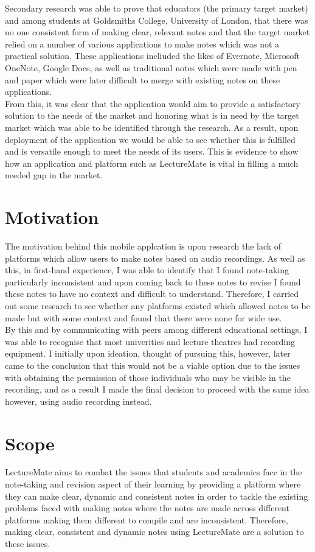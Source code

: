 \documentclass{report}
\begin{document}
Secondary research was able to prove that educators (the primary target market) and among students at Goldsmiths College, University of London, that there was no one consistent form of making clear, relevant notes and that the target market relied on a number of various applications to make notes which was not a practical solution. These applications incliuded the likes of Evernote, Microsoft OneNote, Google Docs, as well as traditional notes which were made with pen and paper which were later difficult to merge with existing notes on these applications.\\

From this, it was clear that the application would aim to provide a satisfactory solution to the needs of the market and honoring what is in need by the target market which was able to be identified through the research. As a result, upon deployment of the application we would be able to see whether this is fulfilled and is versatile enough to meet the needs of its users. This is evidence to show how an application and platform such as LectureMate is vital in filling a much needed gap in the market.

	\section{Motivation}
The motivation behind this mobile applcation is upon research the lack of platforms which allow users to make notes based on audio recordings. As well as this, in first-hand experience, I was able to identify that I found note-taking particularly inconsistent and upon coming back to these notes to revise I found these notes to have no context and difficult to understand. Therefore, I carried out some research to see whether any platforms existed which allowed notes to be made but with some context and found that there were none for wide use.\\

By this and by communicating with peers among different educational settings, I was able to recognise that most univerities and lecture theatres had recording equipment. I initially upon ideation, thought of pursuing this, however, later came to the conclusion that this would not be a viable option due to the issues with obtaining the permission of those individuals who may be visible in the recording, and as a result I made the final decision to proceed with the same idea however, using audio recording instead.

	\section{Scope}
LectureMate aims to combat the issues that students and academics face in the note-taking and revision aspect of their learning by providing a platform where they can make clear, dynamic and consistent notes in order to tackle the existing problems faced with making notes where the notes are made across different platforms making them different to compile and are inconsistent. Therefore, making clear, consistent and dynamic notes using LectureMate are a solution to these issues.
\end{document}
